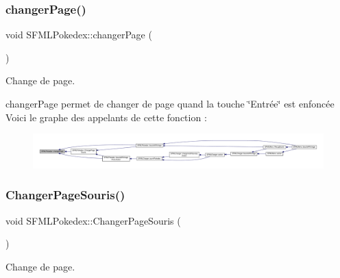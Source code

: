 \subsubsection{\texorpdfstring{changer\+Page()}{changerPage()}}
{\footnotesize\ttfamily void S\+F\+M\+L\+Pokedex\+::changer\+Page (\begin{DoxyParamCaption}{ }\end{DoxyParamCaption})\hspace{0.3cm}{\ttfamily [private]}}



Change de page. 

changer\+Page permet de changer de page quand la touche \char`\"{}\+Entrée\char`\"{} est enfoncée Voici le graphe des appelants de cette fonction \+:\nopagebreak
\begin{figure}[H]
\begin{center}
\leavevmode
\includegraphics[width=350pt]{class_s_f_m_l_pokedex_a94f3d84825cc9bac5efff4123b7cc154_icgraph}
\end{center}
\end{figure}
\mbox{\label{class_s_f_m_l_pokedex_a9528e644324e4b4c6f0b0a3e7fcdde79}} 
\subsubsection{\texorpdfstring{Changer\+Page\+Souris()}{ChangerPageSouris()}}
{\footnotesize\ttfamily void S\+F\+M\+L\+Pokedex\+::\+Changer\+Page\+Souris (\begin{DoxyParamCaption}{ }\end{DoxyParamCaption})\hspace{0.3cm}{\ttfamily [private]}}



Change de page. 

